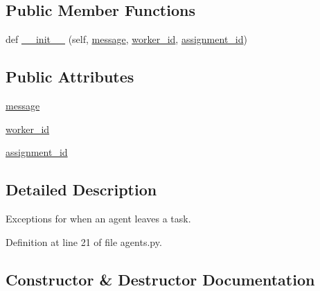 \subsection*{Public Member Functions}
\begin{DoxyCompactItemize}
\item 
def \hyperlink{classparlai_1_1mturk_1_1core_1_1dev_1_1agents_1_1AbsentAgentError_a1094e79da4d129d6b135fcabbe0175e0}{\+\_\+\+\_\+init\+\_\+\+\_\+} (self, \hyperlink{classparlai_1_1mturk_1_1core_1_1dev_1_1agents_1_1AbsentAgentError_a469a3b342c2877da0824bc08c0a91c54}{message}, \hyperlink{classparlai_1_1mturk_1_1core_1_1dev_1_1agents_1_1AbsentAgentError_a26db50c87a5d4954907d538de3da875c}{worker\+\_\+id}, \hyperlink{classparlai_1_1mturk_1_1core_1_1dev_1_1agents_1_1AbsentAgentError_ab9cf020196d28024b307c41a3fff6be1}{assignment\+\_\+id})
\end{DoxyCompactItemize}
\subsection*{Public Attributes}
\begin{DoxyCompactItemize}
\item 
\hyperlink{classparlai_1_1mturk_1_1core_1_1dev_1_1agents_1_1AbsentAgentError_a469a3b342c2877da0824bc08c0a91c54}{message}
\item 
\hyperlink{classparlai_1_1mturk_1_1core_1_1dev_1_1agents_1_1AbsentAgentError_a26db50c87a5d4954907d538de3da875c}{worker\+\_\+id}
\item 
\hyperlink{classparlai_1_1mturk_1_1core_1_1dev_1_1agents_1_1AbsentAgentError_ab9cf020196d28024b307c41a3fff6be1}{assignment\+\_\+id}
\end{DoxyCompactItemize}


\subsection{Detailed Description}
\begin{DoxyVerb}Exceptions for when an agent leaves a task.
\end{DoxyVerb}
 

Definition at line 21 of file agents.\+py.



\subsection{Constructor \& Destructor Documentation}
\mbox{\label{classparlai_1_1mturk_1_1core_1_1dev_1_1agents_1_1AbsentAgentError_a1094e79da4d129d6b135fcabbe0175e0}} 
